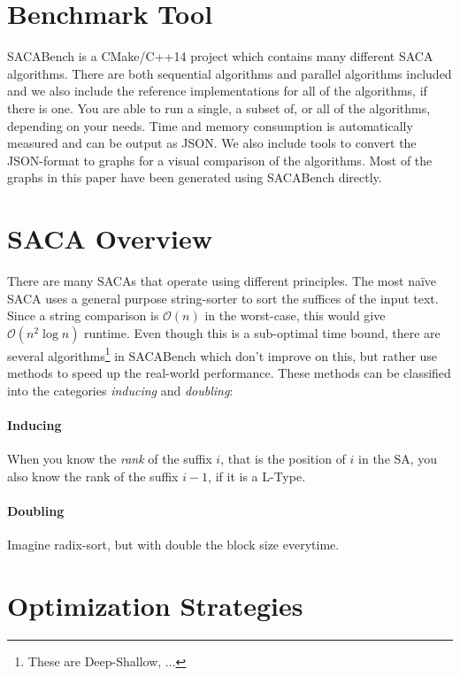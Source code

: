 \section{Benchmark Tool}

SACABench is a CMake/C++14 project which contains many different SACA algorithms.
There are both sequential algorithms and parallel algorithms included and we also include the reference implementations for all of the algorithms, if there is one.
You are able to run a single, a subset of, or all of the algorithms, depending on your needs.
Time and memory consumption is automatically measured and can be output as JSON.
We also include tools to convert the JSON-format to graphs for a visual comparison of the algorithms.
Most of the graphs in this paper have been generated using SACABench directly.

\section{SACA Overview}

There are many SACAs that operate using different principles.
The most na\"ive SACA uses a general purpose string-sorter to sort the suffices of the input text.
Since a string comparison is $\mathcal O (n)$ in the worst-case, this would give $\mathcal O (n^2 \log n)$ runtime.
Even though this is a sub-optimal time bound,
there are several algorithms\footnote{These are Deep-Shallow, ...} in SACABench which don't improve on this,
but rather use methods to speed up the real-world performance.
These methods can be classified into the categories \emph{inducing} and \emph{doubling}:
%
\paragraph{Inducing} When you know the \emph{rank} of the suffix $i$, that is the position of $i$ in the SA, you also know the rank of the suffix $i-1$, if it is a L-Type.
\paragraph{Doubling} Imagine radix-sort, but with double the block size everytime. 

\bigskip

\blindtext

\section{Optimization Strategies}
